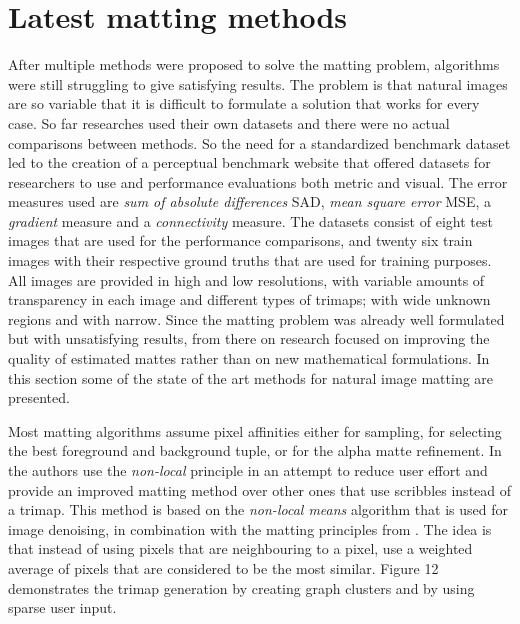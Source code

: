 \section{Latest matting methods}
\label{sec:latest-matting-methods}

After multiple methods were proposed to solve the matting problem, algorithms were still struggling to give satisfying results. The problem is that natural images are so variable that it is difficult to formulate a solution that works for every case. So far researches used their own datasets and there were no actual comparisons between methods. So the need for a standardized benchmark dataset led to the creation of a perceptual benchmark website \cite{benchmark} that offered datasets for researchers to use and performance evaluations both metric and visual. The error measures used are \textit{sum of absolute differences} SAD, \textit{mean square error} MSE, a \textit{gradient} measure and a \textit{connectivity} measure. The datasets consist of eight test images that are used for the performance comparisons, and twenty six train images with their respective ground truths that are used for training purposes. All images are provided in high and low resolutions, with variable amounts of transparency in each image and different types of trimaps; with wide unknown regions and with narrow. Since the matting problem was already well formulated but with unsatisfying results, from there on research focused on improving the quality of estimated mattes rather than on new mathematical formulations. In this section some of the state of the art methods for natural image matting are presented.
\par
Most matting algorithms assume pixel affinities either for sampling, for selecting the best foreground and background tuple, or for the alpha matte refinement. In \cite{nonlocal} the authors use the \textit{non-local} principle in an attempt to reduce user effort and provide an improved matting method over other ones that use scribbles instead of a trimap. This method is based on the \textit{non-local means} algorithm that is used for image denoising, in combination with the matting principles from \cite{closedform}. The idea is that instead of using pixels that are neighbouring to a pixel, use a weighted average of pixels that are considered to be the most similar. Figure 12 demonstrates the trimap generation by creating graph clusters and by using sparse user input.

